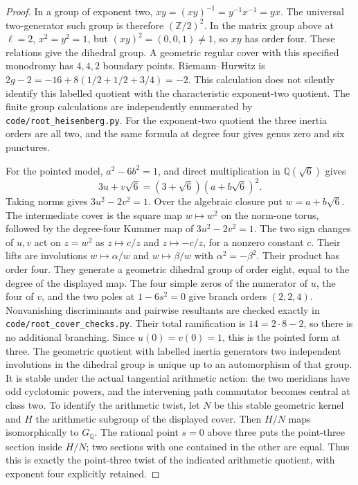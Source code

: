 \begin{proof}
In a group of exponent two,
\(xy=(xy)^{-1}=y^{-1}x^{-1}=yx\). The universal two-generator
such group is therefore \((\mathbb Z/2)^2\).
In the matrix group above at \(\ell=2\), \(x^2=y^2=1\), but
\((xy)^2=(0,0,1)\ne1\), so \(xy\) has order four. These relations
give the dihedral group. A geometric regular cover with this specified
monodromy has \(4,4,2\) boundary points. Riemann--Hurwitz is
\(2g-2=-16+8(1/2+1/2+3/4)=-2\).
This calculation does not silently identify this labelled quotient with
the characteristic exponent-two quotient. The finite group calculations
are independently enumerated by \texttt{code/root\_heisenberg.py}.
For the exponent-two quotient the three inertia orders are all two,
and the same formula at degree four gives genus zero and six punctures.

For the pointed model, \(a^2-6b^2=1\), and direct multiplication in
\(\mathbb Q(\sqrt6)\) gives
\[
 3u+v\sqrt6=(3+\sqrt6)(a+b\sqrt6)^2.
\]
Taking norms gives \(3u^2-2v^2=1\). Over the algebraic closure put
\(w=a+b\sqrt6\). The intermediate cover is the square map
\(w\mapsto w^2\) on the norm-one torus, followed by the degree-four
Kummer map of \(3u^2-2v^2=1\). The two sign changes of \(u,v\)
act on \(z=w^2\) as \(z\mapsto c/z\) and
\(z\mapsto-c/z\), for a nonzero constant \(c\).
Their lifts are involutions \(w\mapsto\alpha/w\) and
\(w\mapsto\beta/w\) with \(\alpha^2=-\beta^2\).
Their product has order four. They generate a geometric dihedral
group of order eight, equal to the degree of the displayed map.
The four simple zeros of the numerator of \(u\), the four of
\(v\), and the two poles at \(1-6s^2=0\) give branch orders
\((2,2,4)\). Nonvanishing discriminants and pairwise resultants
are checked exactly in \texttt{code/root\_cover\_checks.py}.
Their total ramification is \(14=2\cdot8-2\), so there is no
additional branching. Since \(u(0)=v(0)=1\), this is the
pointed form at three. The geometric quotient with labelled inertia
generators two independent involutions in the dihedral group is unique
up to an automorphism of that group. It is stable under the actual
tangential arithmetic action: the two meridians have odd cyclotomic
powers, and the intervening path commutator becomes central at class
two. To identify the arithmetic twist, let \(N\) be this stable
geometric kernel and \(H\) the arithmetic subgroup of the displayed
cover. Then \(H/N\) maps isomorphically to \(G_{\mathbb Q}\).
The rational point \(s=0\) above three puts the point-three section
inside \(H/N\); two sections with one contained in the other are equal.
Thus this is exactly the point-three twist of the indicated arithmetic
quotient, with exponent four explicitly retained.
\end{proof}

